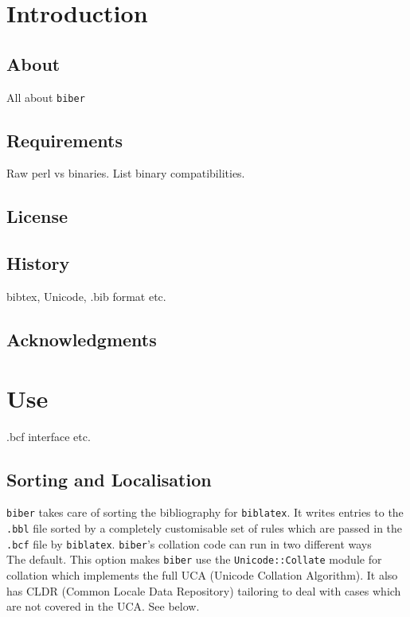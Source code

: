 \documentclass{ltxdockit}
\def\biberex#1{\hbox{\hspace{-4em}\texttt{\small \detokenize{#1}}}}
\begin{document}
\printtitlepage
\tableofcontents

\section{Introduction}
\label{int}

\subsection{About}

All about \verb=biber=

\subsection{Requirements}\label{ref:req}

Raw perl vs binaries. List binary compatibilities.

\subsection{License}


\subsection{History}

bibtex, Unicode, .bib format etc.

\subsection{Acknowledgments}


\section{Use}\label{ref:use}
\label{use}

.bcf interface etc.

\subsection{Sorting and Localisation}

\verb=biber= takes care of sorting the bibliography for \verb=biblatex=. It writes
entries to the \verb=.bbl= file sorted by a completely customisable set of rules
which are passed in the \verb=.bcf= file by \verb=biblatex=. \verb=biber='s collation code
can run in two different ways\\[2ex]

\biberex{--collate|-C} The default. This option makes \verb=biber= use the
  \verb=Unicode::Collate= module for collation which implements the full UCA (Unicode
  Collation Algorithm). It also has CLDR (Common Locale Data
  Repository) tailoring to deal with cases which are not covered in the
  UCA. See below.\\[1ex]
\end{document}
